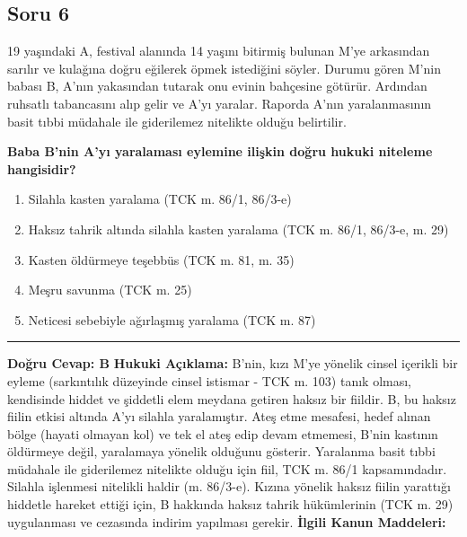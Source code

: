\documentclass[a4paper, 11pt, twocolumn]{article}
\begin{document}
\newpage

\subsection*{Soru 6}
19 yaşındaki A, festival alanında 14 yaşını bitirmiş bulunan M'ye arkasından sarılır ve kulağına doğru eğilerek öpmek istediğini söyler. Durumu gören M'nin babası B, A'nın yakasından tutarak onu evinin bahçesine götürür. Ardından ruhsatlı tabancasını alıp gelir ve A'yı yaralar. Raporda A'nın yaralanmasının basit tıbbi müdahale ile giderilemez nitelikte olduğu belirtilir.

\textbf{Baba B'nin A'yı yaralaması eylemine ilişkin doğru hukuki niteleme hangisidir?}

\begin{enumerate}[label=\Alph*)]
    \item Silahla kasten yaralama (TCK m. 86/1, 86/3-e)
    \item Haksız tahrik altında silahla kasten yaralama (TCK m. 86/1, 86/3-e, m. 29)
    \item Kasten öldürmeye teşebbüs (TCK m. 81, m. 35)
    \item Meşru savunma (TCK m. 25)
    \item Neticesi sebebiyle ağırlaşmış yaralama (TCK m. 87)
\end{enumerate}
\vspace{0.5cm}
\hrule
\vspace{0.5cm}
\textbf{Doğru Cevap: B}
\newline
\textbf{Hukuki Açıklama:} B'nin, kızı M'ye yönelik cinsel içerikli bir eyleme (sarkıntılık düzeyinde cinsel istismar - TCK m. 103) tanık olması, kendisinde hiddet ve şiddetli elem meydana getiren haksız bir fiildir. B, bu haksız fiilin etkisi altında A'yı silahla yaralamıştır. Ateş etme mesafesi, hedef alınan bölge (hayati olmayan kol) ve tek el ateş edip devam etmemesi, B'nin kastının öldürmeye değil, yaralamaya yönelik olduğunu gösterir. Yaralanma basit tıbbi müdahale ile giderilemez nitelikte olduğu için fiil, TCK m. 86/1 kapsamındadır. Silahla işlenmesi nitelikli haldir (m. 86/3-e). Kızına yönelik haksız fiilin yarattığı hiddetle hareket ettiği için, B hakkında haksız tahrik hükümlerinin (TCK m. 29) uygulanması ve cezasında indirim yapılması gerekir.
\vspace{0.5cm}
\textbf{İlgili Kanun Maddeleri:}
\end{document}
